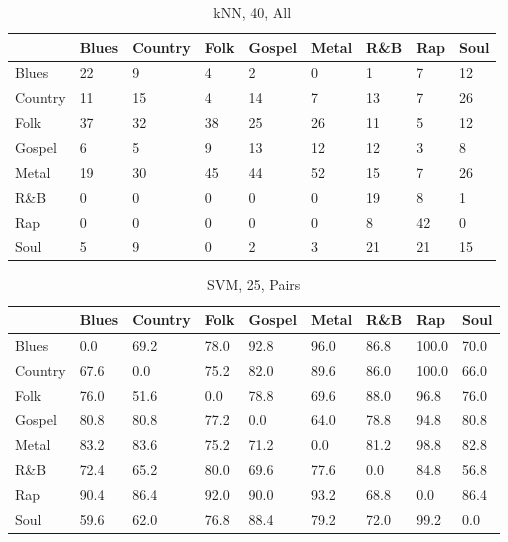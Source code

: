 \documentclass[a4paper,oneside]{article}
\begin{document}
\begin{table}[H]\centering
\caption{kNN, 40, All}
\begin{tabu}{l|*{8}{l}}
 & Blues & Country & Folk & Gospel & Metal & R\&B & Rap & Soul \\ \hline
Blues & 22 & 9 & 4 & 2 & 0 & 1 & 7 & 12 \\
Country & 11 & 15 & 4 & 14 & 7 & 13 & 7 & 26 \\
Folk & 37 & 32 & 38 & 25 & 26 & 11 & 5 & 12 \\
Gospel & 6 & 5 & 9 & 13 & 12 & 12 & 3 & 8 \\
Metal & 19 & 30 & 45 & 44 & 52 & 15 & 7 & 26 \\
R\&B & 0 & 0 & 0 & 0 & 0 & 19 & 8 & 1 \\
Rap & 0 & 0 & 0 & 0 & 0 & 8 & 42 & 0 \\
Soul & 5 & 9 & 0 & 2 & 3 & 21 & 21 & 15 \\
\end{tabu}
\end{table}

\begin{table}[H]\centering
\caption{SVM, 25, Pairs}
\begin{tabu}{l|*{8}{l}}
 & Blues & Country & Folk & Gospel & Metal & R\&B & Rap & Soul \\ \hline
Blues & 0.0 & 69.2 & 78.0 & 92.8 & 96.0 & 86.8 & 100.0 & 70.0 \\
Country & 67.6 & 0.0 & 75.2 & 82.0 & 89.6 & 86.0 & 100.0 & 66.0 \\
Folk & 76.0 & 51.6 & 0.0 & 78.8 & 69.6 & 88.0 & 96.8 & 76.0 \\
Gospel & 80.8 & 80.8 & 77.2 & 0.0 & 64.0 & 78.8 & 94.8 & 80.8 \\
Metal & 83.2 & 83.6 & 75.2 & 71.2 & 0.0 & 81.2 & 98.8 & 82.8 \\
R\&B & 72.4 & 65.2 & 80.0 & 69.6 & 77.6 & 0.0 & 84.8 & 56.8 \\
Rap & 90.4 & 86.4 & 92.0 & 90.0 & 93.2 & 68.8 & 0.0 & 86.4 \\
Soul & 59.6 & 62.0 & 76.8 & 88.4 & 79.2 & 72.0 & 99.2 & 0.0 \\
\end{tabu}
\end{table}
\end{document}
